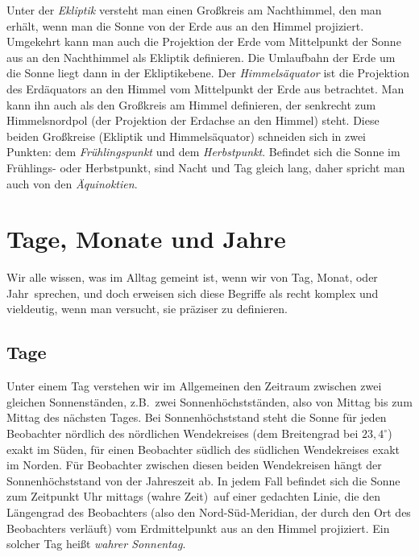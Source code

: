 Unter der \textit{Ekliptik} 
versteht man einen Gro\ss kreis am Nachthimmel, den man erh\"alt,
wenn man die Sonne von der Erde aus an den Himmel projiziert. Umgekehrt kann man auch
die Projektion der Erde vom Mittelpunkt der Sonne aus an den Nachthimmel als Ekliptik 
definieren. Die Umlaufbahn der Erde um die Sonne liegt dann in der Ekliptikebene.
Der \textit{Himmels\"aquator} ist die Projektion des Erd\"aquators an den Himmel vom Mittelpunkt 
der Erde aus betrachtet.
Man kann ihn auch als den Gro\ss kreis am Himmel definieren, der senkrecht zum
Himmelsnordpol (der Projektion der Erdachse an den Himmel) steht. Diese beiden
Gro\ss kreise (Ekliptik und Himmels\"aquator) schneiden sich in zwei Punkten:
dem \textit{Fr\"uhlingspunkt}
und dem \textit{Herbstpunkt}.
Befindet sich die Sonne im Fr\"uhlings- oder Herbstpunkt, sind Nacht und Tag
gleich lang, daher spricht man auch von den \textit{\"Aquinoktien}.

\section{Tage, Monate und Jahre}

Wir alle wissen, was im Alltag gemeint ist, wenn wir von \glqq Tag\grqq,  \glqq Monat\grqq, oder
\glqq Jahr\grqq\ sprechen, und doch erweisen sich diese Begriffe als recht komplex und vieldeutig,
wenn man versucht, sie pr\"aziser zu definieren. 

\subsection{Tage}

Unter einem Tag 
verstehen wir im Allgemeinen den Zeitraum zwischen zwei gleichen 
Sonnenst\"anden, z.B.\ zwei Sonnenh\"ochstst\"anden,
also von Mittag bis zum Mittag des n\"achsten Tages. Bei Sonnenh\"ochststand steht die Sonne
f\"ur jeden Beobachter n\"ordlich des n\"ordlichen Wendekreises (dem Breitengrad bei $23,4^\circ$)
exakt im S\"uden, f\"ur einen Beobachter s\"udlich des s\"udlichen Wendekreises exakt im Norden.
F\"ur Beobachter zwischen diesen beiden Wendekreisen h\"angt der Sonnenh\"ochststand von der
Jahreszeit ab. In jedem Fall befindet sich die Sonne zum Zeitpunkt  Uhr mittags (wahre Zeit)\grqq\
auf einer gedachten Linie, die den L\"angengrad des Beobachters
(also den Nord-S\"ud-Meridian, der durch den Ort des Beobachters verl\"auft) vom Erdmittelpunkt
aus an den Himmel projiziert. Ein solcher Tag hei\ss t \textit{wahrer Sonnentag}. 

